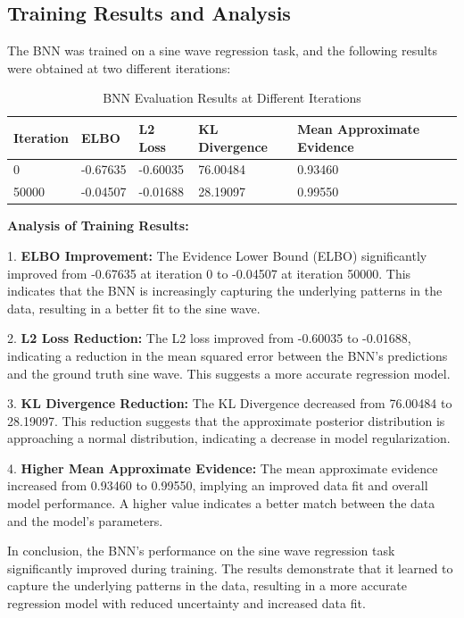 \documentclass{article}
\begin{document}
\subsection{Training Results and Analysis}

The BNN was trained on a sine wave regression task, and the following results were obtained at two different iterations:

\begin{table}[h]
\centering
\caption{BNN Evaluation Results at Different Iterations}
\label{tab:bnn-eval-iterations}
\begin{tabular}{|l|l|l|l|l|}
\hline
\textbf{Iteration} & \textbf{ELBO} & \textbf{L2 Loss} & \textbf{KL Divergence} & \textbf{Mean Approximate Evidence} \\
\hline
0 & -0.67635 & -0.60035 & 76.00484 & 0.93460 \\
\hline
50000 & -0.04507 & -0.01688 & 28.19097 & 0.99550 \\
\hline
\end{tabular}
\end{table}
\textbf{Analysis of Training Results:}

1. \textbf{ELBO Improvement:} The Evidence Lower Bound (ELBO) significantly improved from -0.67635 at iteration 0 to -0.04507 at iteration 50000. This indicates that the BNN is increasingly capturing the underlying patterns in the data, resulting in a better fit to the sine wave.

2. \textbf{L2 Loss Reduction:} The L2 loss improved from -0.60035 to -0.01688, indicating a reduction in the mean squared error between the BNN's predictions and the ground truth sine wave. This suggests a more accurate regression model.

3. \textbf{KL Divergence Reduction:} The KL Divergence decreased from 76.00484 to 28.19097. This reduction suggests that the approximate posterior distribution is approaching a normal distribution, indicating a decrease in model regularization.

4. \textbf{Higher Mean Approximate Evidence:} The mean approximate evidence increased from 0.93460 to 0.99550, implying an improved data fit and overall model performance. A higher value indicates a better match between the data and the model's parameters.

In conclusion, the BNN's performance on the sine wave regression task significantly improved during training. The results demonstrate that it learned to capture the underlying patterns in the data, resulting in a more accurate regression model with reduced uncertainty and increased data fit.
\end{document}

